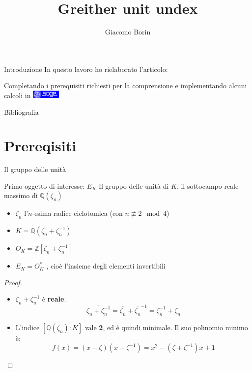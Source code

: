 \documentclass{beamer}
\title{Greither unit undex}
\author{Giacomo Borin}
\institute{Università di Trento}
\theoremstyle{plain}
\theoremstyle{remark}
\theoremstyle{definition}
\newcommand{\noqed}{\let\qed\relax}
\newcommand{\Z}{\mathbb{Z}}
\newcommand{\Q}{\mathbb{Q}}
\begin{document}
	\begin{frame}[plain]
	    \maketitle
	\end{frame}
	
	\begin{frame}{Introduzione}
		In questo lavoro ho rielaborato l'articolo: 
		\begin{exampleblock}{}
		\end{exampleblock}	
		\pause
		Completando i prerequisiti richiesti per la comprensione e implementando alcuni calcoli in \href{https://www.sagemath.org}{\includegraphics[height= 11pt]{../images/sage.png} }
	\end{frame}
	
	\begin{frame}{Bibliografia}
			\printbibliography[heading=none]
	\end{frame}
	

	
	\section{Prereqisiti}

	\begin{frame}{Il gruppo delle unità}
		\begin{block}{Primo oggetto di interesse: $ E_K $}
			Il gruppo delle unità di $ K $, il sottocampo reale massimo di $ \Q (\zeta_n )  $
		\end{block}
		\pause
		\begin{itemize}
			\item $ \zeta_n $  l'$ n $-esima radice ciclotomica (con $ n \not \equiv 2 \mod 4 $) \pause
			\item $ K = \Q (\zeta_n + \zeta_n^{-1})$ \pause
			\item $ O_K = \Z[\zeta_n + \zeta_n^{-1}] $ \pause
			\item $ E_K = O _K ^\ast$ , cioè l'insieme degli elementi invertibili 
		\end{itemize}
		\hyperlink{skip1}{}
	\end{frame}
	
	\begin{frame}
		\begin{proof} \noqed
			\begin{itemize}
			\item $  \zeta_n + \zeta_n^{-1}  $ è \textbf{reale}:
			\[ \overline{\zeta_n + \zeta_n^{-1}} = \overline{\zeta_n} + \overline{\zeta_n}^{-1} = \zeta_n^{-1} + \zeta_n \] \pause
			\item L'indice $ [\Q(\zeta_n) : K] $ vale \textbf{2}, ed è quindi minimale. \pause 
			Il suo polinomio minimo è: 
			\[ f(x) = (x-\zeta)(x- \zeta^{-1}) = x^2 - (\zeta + \zeta ^{-1})x +1   \]
			\end{itemize}
		\end{proof}
	\end{frame}
	
\end{document}
